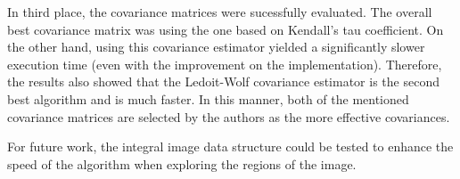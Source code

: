 \documentclass[11pt]{article}
\theoremstyle{definition}
\theoremstyle{remark}
\theoremstyle{remark}
\theoremstyle{remark}
\begin{document}
In third place, the covariance matrices were sucessfully evaluated. The overall
best covariance matrix was using the one based on Kendall's tau coefficient. On
the other hand, using this covariance estimator yielded a significantly slower
execution time (even with the improvement on the implementation). Therefore, the
results also showed that the Ledoit-Wolf covariance estimator is the second best
algorithm and is much faster. In this manner, both of the mentioned covariance
matrices are selected by the authors as the more effective covariances.

For future work, the integral image data structure
\parencite{porikli2005integral} could be tested to enhance the speed of the
algorithm when exploring the regions of the image.

\printbibliography
\end{document}

